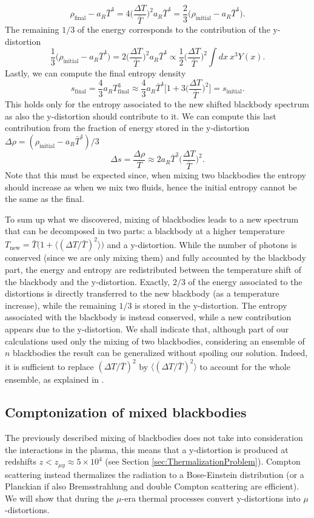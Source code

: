 $$\rho_\text{final}-a_R \bar T^4=4\bigg(\frac{\Delta T}{\bar T}\bigg)^2a_R\bar T^4=\frac{2}{3}\bigg(\rho_\text{initial}-a_R \bar T^4\bigg).$$
The remaining $1/3$ of the energy corresponds to the contribution of the y-distortion
$$\frac{1}{3}\bigg(\rho_\text{initial}-a_R \bar T^4\bigg)=2\bigg(\frac{\Delta T}{\bar T}\bigg)^2a_R\bar T^4\propto\frac{1}{2}\bigg(\frac{\Delta T}{\bar T}\bigg)^2\int dx\ x^3 Y(x).$$
Lastly, we can compute the final entropy density$$ s_\text{final}=\frac{4}{3}a_RT_\text{final}^3\approx\frac{4}{3}a_R \bar T^4\bigg[1+3\bigg(\frac{\Delta T}{\bar T}\bigg)^2\bigg]=s_\text{initial}.$$ This holds only for the entropy associated to the new shifted blackbody spectrum as also the y-distortion should contribute to it. We can compute this last contribution from the fraction of energy stored in the y-distortion $\Delta \rho = (\rho_\text{initial}-a_R \bar T^4)/3$
$$\Delta s=\frac{\Delta \rho}{T}\approx 2a_R \bar T^3\bigg(\frac{\Delta T}{\bar T}\bigg)^2.$$
Note that this must be expected since, when mixing two blackbodies the entropy should increase as when we mix two fluids, hence the initial entropy cannot be the same as the final.

To sum up what we discovered, mixing of blackbodies leads to a new spectrum that can be decomposed in two parts: a blackbody at a higher temperature $T_\text{new}=\bar T\big(1+\langle(\Delta T/\bar T)^2\rangle\big)$ and a y-distortion. While the number of photons is conserved (since we are only mixing them) and fully accounted by the blackbody part, the energy and entropy are redistributed between the temperature shift of the blackbody and the y-distortion. Exactly, $2/3$ of the energy associated to the distortions is directly transferred to the new blackbody (as a temperature increase), while the remaining $1/3$ is stored in the y-distortion. The entropy associated with the blackbody is instead conserved, while a new contribution appears due to the y-distortion. We shall indicate that, although part of our calculations used only the mixing of two blackbodies, considering an ensemble of $n$ blackbodies the result can be generalized without spoiling our solution. Indeed, it is sufficient to replace $(\Delta T/\bar T)^2$ by $\langle(\Delta T/\bar T)^2\rangle$ to account for the whole ensemble, as explained in \cite{MixingBB}.
\subsection{Comptonization of mixed blackbodies}
\label{sec:MixSD_Comportonization}
The previously described mixing of blackbodies does not take into consideration the interactions in the plasma, this means that a y-distortion is produced at redshifts $z<z_{\mu y}\approx 5\times 10^4$ (see Section \ref{sec:ThermalizationProblem}). Compton scattering instead thermalizes the radiation to a Bose-Einstein distribution (or a Planckian if also Bremsstrahlung and double Compton scattering are efficient). We will show that during the $\mu$-era thermal processes convert y-distortions into $\mu$-distortions. 


